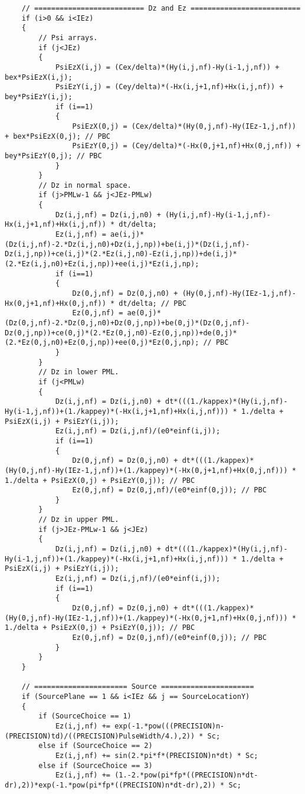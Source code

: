 \begin{lstlisting}
	// ========================== Dz and Ez ==========================
	if (i>0 && i<IEz)
	{
		// Psi arrays.
		if (j<JEz)
		{
			PsiEzX(i,j) = (Cex/delta)*(Hy(i,j,nf)-Hy(i-1,j,nf)) + bex*PsiEzX(i,j);
			PsiEzY(i,j) = (Cey/delta)*(-Hx(i,j+1,nf)+Hx(i,j,nf)) + bey*PsiEzY(i,j);
			if (i==1)
			{
				PsiEzX(0,j) = (Cex/delta)*(Hy(0,j,nf)-Hy(IEz-1,j,nf)) + bex*PsiEzX(0,j); // PBC
				PsiEzY(0,j) = (Cey/delta)*(-Hx(0,j+1,nf)+Hx(0,j,nf)) + bey*PsiEzY(0,j); // PBC
			}
		}
		// Dz in normal space.
		if (j>PMLw-1 && j<JEz-PMLw)
		{
			Dz(i,j,nf) = Dz(i,j,n0) + (Hy(i,j,nf)-Hy(i-1,j,nf)-Hx(i,j+1,nf)+Hx(i,j,nf)) * dt/delta;
			Ez(i,j,nf) = ae(i,j)*(Dz(i,j,nf)-2.*Dz(i,j,n0)+Dz(i,j,np))+be(i,j)*(Dz(i,j,nf)-Dz(i,j,np))+ce(i,j)*(2.*Ez(i,j,n0)-Ez(i,j,np))+de(i,j)*(2.*Ez(i,j,n0)+Ez(i,j,np))+ee(i,j)*Ez(i,j,np);
			if (i==1)
			{
				Dz(0,j,nf) = Dz(0,j,n0) + (Hy(0,j,nf)-Hy(IEz-1,j,nf)-Hx(0,j+1,nf)+Hx(0,j,nf)) * dt/delta; // PBC
				Ez(0,j,nf) = ae(0,j)*(Dz(0,j,nf)-2.*Dz(0,j,n0)+Dz(0,j,np))+be(0,j)*(Dz(0,j,nf)-Dz(0,j,np))+ce(0,j)*(2.*Ez(0,j,n0)-Ez(0,j,np))+de(0,j)*(2.*Ez(0,j,n0)+Ez(0,j,np))+ee(0,j)*Ez(0,j,np); // PBC
			}
		}
		// Dz in lower PML.
		if (j<PMLw)
		{
			Dz(i,j,nf) = Dz(i,j,n0) + dt*(((1./kappex)*(Hy(i,j,nf)-Hy(i-1,j,nf))+(1./kappey)*(-Hx(i,j+1,nf)+Hx(i,j,nf))) * 1./delta + PsiEzX(i,j) + PsiEzY(i,j));
			Ez(i,j,nf) = Dz(i,j,nf)/(e0*einf(i,j));
			if (i==1)
			{
				Dz(0,j,nf) = Dz(0,j,n0) + dt*(((1./kappex)*(Hy(0,j,nf)-Hy(IEz-1,j,nf))+(1./kappey)*(-Hx(0,j+1,nf)+Hx(0,j,nf))) * 1./delta + PsiEzX(0,j) + PsiEzY(0,j)); // PBC
				Ez(0,j,nf) = Dz(0,j,nf)/(e0*einf(0,j)); // PBC
			}
		}
		// Dz in upper PML.
		if (j>JEz-PMLw-1 && j<JEz)
		{
			Dz(i,j,nf) = Dz(i,j,n0) + dt*(((1./kappex)*(Hy(i,j,nf)-Hy(i-1,j,nf))+(1./kappey)*(-Hx(i,j+1,nf)+Hx(i,j,nf))) * 1./delta + PsiEzX(i,j) + PsiEzY(i,j));
			Ez(i,j,nf) = Dz(i,j,nf)/(e0*einf(i,j));
			if (i==1)
			{
				Dz(0,j,nf) = Dz(0,j,n0) + dt*(((1./kappex)*(Hy(0,j,nf)-Hy(IEz-1,j,nf))+(1./kappey)*(-Hx(0,j+1,nf)+Hx(0,j,nf))) * 1./delta + PsiEzX(0,j) + PsiEzY(0,j)); // PBC
				Ez(0,j,nf) = Dz(0,j,nf)/(e0*einf(0,j)); // PBC
			}
		}
	}

	// ====================== Source ======================
	if (SourcePlane == 1 && i<IEz && j == SourceLocationY)
	{
		if (SourceChoice == 1)
			Ez(i,j,nf) += exp(-1.*pow(((PRECISION)n-(PRECISION)td)/((PRECISION)PulseWidth/4.),2)) * Sc;
		else if (SourceChoice == 2)
			Ez(i,j,nf) += sin(2.*pi*f*(PRECISION)n*dt) * Sc;
		else if (SourceChoice == 3)
			Ez(i,j,nf) += (1.-2.*pow(pi*fp*((PRECISION)n*dt-dr),2))*exp(-1.*pow(pi*fp*((PRECISION)n*dt-dr),2)) * Sc;


\end{lstlisting}
